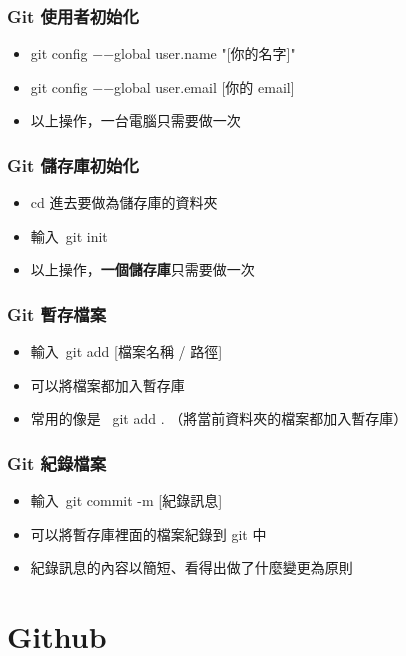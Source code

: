\documentclass[mathserif]{beamer}
\begin{document}
\begin{frame}
    \frametitle{Git 使用者初始化}
    \begin{itemize}
        \item {\color{red} git config −−global user.name "[你的名字]"}
        \item {\color{red} git config −−global user.email [你的 email]}
        \item 以上操作，一台電腦只需要做一次
    \end{itemize}
\end{frame}

\begin{frame}
    \frametitle{Git 儲存庫初始化}
    \begin{itemize}
        \item {\color{red}cd} 進去要做為儲存庫的資料夾
        \item 輸入\ {\color{red}git init}
        \item 以上操作，\textbf{一個儲存庫}只需要做一次
    \end{itemize}
\end{frame}

\begin{frame}
    \frametitle{Git 暫存檔案}
    \begin{itemize}
        \item 輸入\ {\color{red}git add [檔案名稱 / 路徑]}
        \item 可以將檔案都加入暫存庫
        \vspace{0.5cm}
        \item<2-> 常用的像是\ {\color{red} git add .} （將當前資料夾的檔案都加入暫存庫）
    \end{itemize}
\end{frame}

\begin{frame}
    \frametitle{Git 紀錄檔案}
    \begin{itemize}
        \item 輸入\ {\color{red}git commit -m [紀錄訊息]}
        \item 可以將暫存庫裡面的檔案紀錄到 git 中
        \vspace{0.5cm}
        \item<2-> 紀錄訊息的內容以簡短、看得出做了什麼變更為原則
    \end{itemize}
\end{frame}

\section{Github}
\end{document}
